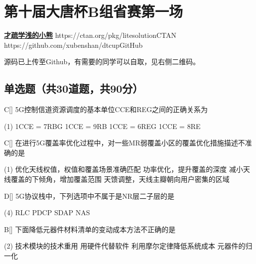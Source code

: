 \chapter{第十届大唐杯B组省赛第一场}
\fancyhead[R]{\color{H6}\kaishu\rightmark\,}

\date{2023年4月08日}{}{\href{https://qm.qq.com/q/UPbGudx8cK}{\textbf{才疏学浅的小熊}}}
{}
{https://ctan.org/pkg/litesolution}{CTAN}
{https://github.com/xubenshan/dtcup}{GitHub}

源码已上传至Github，有需要的同学可以自取，见右侧二维码。

\section{单选题（共30道题，共90分）}



\begin{choice}{C}[]
    5G控制信道资源调度的基本单位CCE和REG之间的正确关系为
    \begin{tasks}(1)
        \task 1CCE = 7RBG
        \task 1CCE = 9RB
        \task 1CCE = 6REG
        \task 1CCE = 8RE
    \end{tasks}
\end{choice}


\begin{choice}{C}[]
    在进行5G覆盖率优化过程中，对一些MR弱覆盖小区的覆盖优化措施描述不准确的是
    \begin{tasks}(1)
        \task 优化天线权值，权值和覆盖场景准确匹配
        \task 功率优化，提升覆盖的深度
        \task 减小天线覆盖的下倾角，增加覆盖范围
        \task 天馈调整，天线主瓣朝向用户密集的区域
    \end{tasks}
\end{choice}




\begin{choice}{D}[]
    5G协议栈中，下列选项中不属于是NR层二子层的是
    \begin{tasks}(4)
        \task RLC
        \task PDCP
        \task SDAP
        \task NAS
    \end{tasks}
\end{choice}


\begin{choice}{B}[]
    下面降低元器件材料清单的变动成本方法不正确的是
    \begin{tasks}(2)
        \task 技术模块的技术重用
        \task 用硬件代替软件
        \task 利用摩尔定律降低系统成本
        \task 元器件的归一化
    \end{tasks}
\end{choice}

